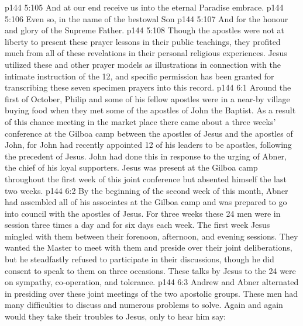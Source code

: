 \vs p144 5:105 \hsetoff And at our end receive us into the eternal Paradise embrace.
\vs p144 5:106 Even so, in the name of the bestowal Son
\vs p144 5:107 \hsetoff And for the honour and glory of the Supreme Father.
\vspace*{1ex}
\vs p144 5:108 Though the apostles were not at liberty to present these prayer lessons in their public teachings, they profited much from all of these revelations in their personal religious experiences. Jesus utilized these and other prayer models as illustrations in connection with the intimate instruction of the 12, and specific permission has been granted for transcribing these seven specimen prayers into this record.
\vs p144 6:1 Around the first of October, Philip and some of his fellow apostles were in a near\hyp{}by village buying food when they met some of the apostles of John the Baptist. As a result of this chance meeting in the market place there came about a three weeks’ conference at the Gilboa camp between the apostles of Jesus and the apostles of John, for John had recently appointed 12 of his leaders to be apostles, following the precedent of Jesus. John had done this in response to the urging of Abner, the chief of his loyal supporters. Jesus was present at the Gilboa camp throughout the first week of this joint conference but absented himself the last two weeks.
\vs p144 6:2 By the beginning of the second week of this month, Abner had assembled all of his associates at the Gilboa camp and was prepared to go into council with the apostles of Jesus. For three weeks these 24 men were in session three times a day and for six days each week. The first week Jesus mingled with them between their forenoon, afternoon, and evening sessions. They wanted the Master to meet with them and preside over their joint deliberations, but he steadfastly refused to participate in their discussions, though he did consent to speak to them on three occasions. These talks by Jesus to the 24 were on sympathy, co\hyp{}operation, and tolerance.
\vs p144 6:3 Andrew and Abner alternated in presiding over these joint meetings of the two apostolic groups. These men had many difficulties to discuss and numerous problems to solve. Again and again would they take their troubles to Jesus, only to hear him say: 
